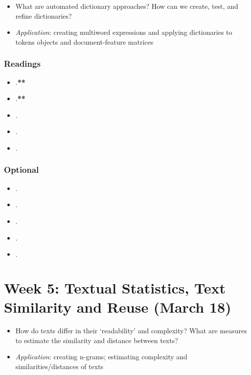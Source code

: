 \documentclass[abstract=on,parskip=full,headings=standardclasses,fontsize=11pt,paper=a4]{scrartcl}
\begin{document}
\begin{itemize}
\renewcommand\labelitemi{--}
\item What are automated dictionary approaches? How can we create, test, and refine dictionaries?
\item \textit{Application}: creating multiword expressions and applying dictionaries to tokens objects and document-feature matrices
\end{itemize}

\subsubsection*{Readings}
\begin{itemize}
\item {}.\textbf{**}
\item {}.\textbf{**}
\item {}.
\item {}.
\item {}.
\end{itemize}

\subsubsection*{Optional}
\begin{itemize}
\item {}.
\item {}.
\item {}.
\item {}.
\item {}.
\end{itemize}

\section{Week 5: Textual Statistics, Text Similarity and Reuse (March 18)}

\begin{itemize}
\renewcommand\labelitemi{--}
\item How do texts differ in their `readability' and complexity? What are measures to estimate the similarity and distance between texts?
\item \textit{Application}: creating n-grams; estimating complexity and similarities/distances of texts
\end{itemize}
\end{document}
